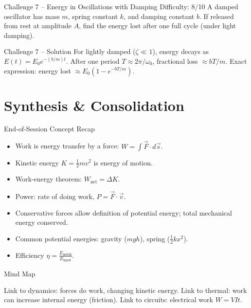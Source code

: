 \documentclass[11pt]{beamer}
\begin{document}
\begin{frame}[shrink=15]{Challenge 7 – Energy in Oscillations with Damping \hfill Difficulty: 8/10}
A damped oscillator has mass $m$, spring constant $k$, and damping constant $b$. If released from rest at amplitude $A$, find the energy lost after one full cycle (under light damping).
\end{frame}

\begin{frame}{Challenge 7 – Solution}
For lightly damped ($\zeta \ll 1$), energy decays as $E(t) = E_0 e^{-(b/m)t}$. After one period $T \approx 2\pi/\omega_0$, fractional loss $\approx bT/m$. Exact expression: energy lost $\approx E_0 (1 - e^{-bT/m})$.
\end{frame}

\section{Synthesis \& Consolidation}

\begin{frame}{End‑of‑Session Concept Recap}
\begin{itemize}
    \item Work is energy transfer by a force: $W = \int \vec{F}\cdot d\vec{s}$.
    \item Kinetic energy $K = \frac12 mv^2$ is energy of motion.
    \item Work-energy theorem: $W_{\text{net}} = \Delta K$.
    \item Power: rate of doing work, $P = \vec{F}\cdot\vec{v}$.
    \item Conservative forces allow definition of potential energy; total mechanical energy conserved.
    \item Common potential energies: gravity ($mgh$), spring ($\frac12 kx^2$).
    \item Efficiency $\eta = \frac{E_{\text{useful}}}{E_{\text{input}}}$.
\end{itemize}
\end{frame}

\begin{frame}{Mind Map}
\centering
{}
\vfill
Link to dynamics: forces do work, changing kinetic energy. Link to thermal: work can increase internal energy (friction). Link to circuits: electrical work $W = VIt$.
\end{frame}
\end{document}

